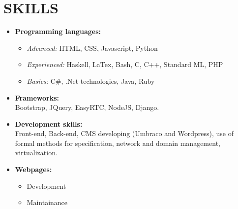 \documentclass[11pt,a4paper,sans]{moderncv}        %
\begin{document}
\ifenglish
\section{SKILLS}
\begin{itemize}
\item \textbf{Programming languages:}
\begin{itemize}
\item \textit{Advanced:} HTML, CSS, Javascript, Python
\item \textit{Experienced:} Haskell, LaTex, Bash, C, C++, Standard ML, PHP
\item \textit{Basics:} C\#, .Net technologies, Java, Ruby
\end{itemize}
\bigskip

\item \textbf{Frameworks:}\\
Bootstrap, JQuery, EasyRTC, NodeJS, Django.
\bigskip

\item \textbf{Development skills:}\\
Front-end, Back-end, CMS developing (Umbraco and Wordpress), use of formal methods for specification, network and domain management, virtualization.
\clearpage

\item \textbf{Webpages:}
\begin{itemize}
\item Development
\item Maintainance
\end{itemize}
\end{itemize}
\else
\end{document}
